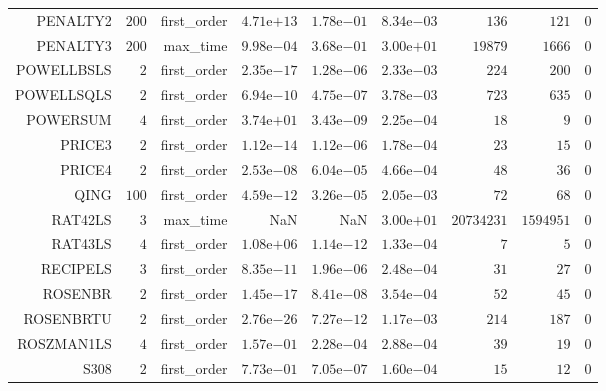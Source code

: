 \begin{longtable}{rrrrrrrrr}
PENALTY2 & \(   200\) & first\_order & \( 4.71\)e\(+13\) & \( 1.78\)e\(-01\) & \( 8.34\)e\(-03\) & \(   136\) & \(   121\) & \(     0\) \\
PENALTY3 & \(   200\) & max\_time & \( 9.98\)e\(-04\) & \( 3.68\)e\(-01\) & \( 3.00\)e\(+01\) & \( 19879\) & \(  1666\) & \(     0\) \\
POWELLBSLS & \(     2\) & first\_order & \( 2.35\)e\(-17\) & \( 1.28\)e\(-06\) & \( 2.33\)e\(-03\) & \(   224\) & \(   200\) & \(     0\) \\
POWELLSQLS & \(     2\) & first\_order & \( 6.94\)e\(-10\) & \( 4.75\)e\(-07\) & \( 3.78\)e\(-03\) & \(   723\) & \(   635\) & \(     0\) \\
POWERSUM & \(     4\) & first\_order & \( 3.74\)e\(+01\) & \( 3.43\)e\(-09\) & \( 2.25\)e\(-04\) & \(    18\) & \(     9\) & \(     0\) \\
PRICE3 & \(     2\) & first\_order & \( 1.12\)e\(-14\) & \( 1.12\)e\(-06\) & \( 1.78\)e\(-04\) & \(    23\) & \(    15\) & \(     0\) \\
PRICE4 & \(     2\) & first\_order & \( 2.53\)e\(-08\) & \( 6.04\)e\(-05\) & \( 4.66\)e\(-04\) & \(    48\) & \(    36\) & \(     0\) \\
QING & \(   100\) & first\_order & \( 4.59\)e\(-12\) & \( 3.26\)e\(-05\) & \( 2.05\)e\(-03\) & \(    72\) & \(    68\) & \(     0\) \\
RAT42LS & \(     3\) & max\_time &       NaN &       NaN & \( 3.00\)e\(+01\) & \(20734231\) & \(1594951\) & \(     0\) \\
RAT43LS & \(     4\) & first\_order & \( 1.08\)e\(+06\) & \( 1.14\)e\(-12\) & \( 1.33\)e\(-04\) & \(     7\) & \(     5\) & \(     0\) \\
RECIPELS & \(     3\) & first\_order & \( 8.35\)e\(-11\) & \( 1.96\)e\(-06\) & \( 2.48\)e\(-04\) & \(    31\) & \(    27\) & \(     0\) \\
ROSENBR & \(     2\) & first\_order & \( 1.45\)e\(-17\) & \( 8.41\)e\(-08\) & \( 3.54\)e\(-04\) & \(    52\) & \(    45\) & \(     0\) \\
ROSENBRTU & \(     2\) & first\_order & \( 2.76\)e\(-26\) & \( 7.27\)e\(-12\) & \( 1.17\)e\(-03\) & \(   214\) & \(   187\) & \(     0\) \\
ROSZMAN1LS & \(     4\) & first\_order & \( 1.57\)e\(-01\) & \( 2.28\)e\(-04\) & \( 2.88\)e\(-04\) & \(    39\) & \(    19\) & \(     0\) \\
S308 & \(     2\) & first\_order & \( 7.73\)e\(-01\) & \( 7.05\)e\(-07\) & \( 1.60\)e\(-04\) & \(    15\) & \(    12\) & \(     0\) \\

\end{longtable}
